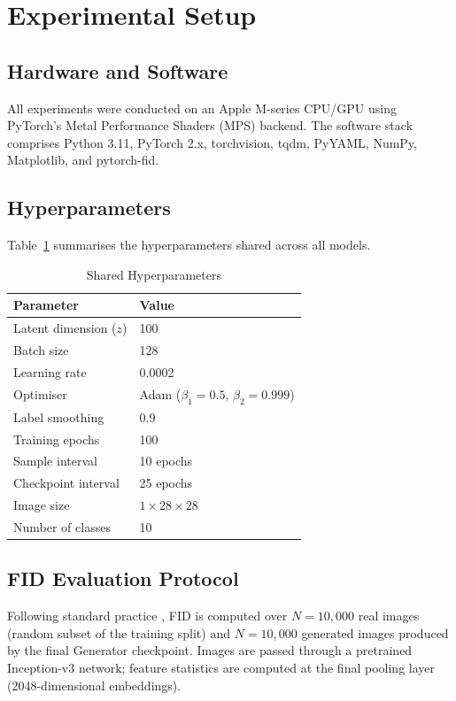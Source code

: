 \documentclass[conference]{IEEEtran}
\begin{document}
\section{Experimental Setup}
\label{sec:exp}

\subsection{Hardware and Software}
All experiments were conducted on an Apple M-series CPU/GPU using PyTorch's Metal Performance Shaders (MPS) backend. The software stack comprises Python 3.11, PyTorch 2.x, torchvision, tqdm, PyYAML, NumPy, Matplotlib, and pytorch-fid.

\subsection{Hyperparameters}
Table~\ref{tab:hyperparams} summarises the hyperparameters shared across all models.

\begin{table}[H]
\centering
\caption{Shared Hyperparameters}
\label{tab:hyperparams}
\begin{tabular}{ll}
\toprule
\textbf{Parameter} & \textbf{Value} \\
\midrule
Latent dimension ($z$) & 100 \\
Batch size & 128 \\
Learning rate & 0.0002 \\
Optimiser & Adam ($\beta_1=0.5$, $\beta_2=0.999$) \\
Label smoothing & 0.9 \\
Training epochs & 100 \\
Sample interval & 10 epochs \\
Checkpoint interval & 25 epochs \\
Image size & $1 \times 28 \times 28$ \\
Number of classes & 10 \\
\bottomrule
\end{tabular}
\end{table}

\subsection{FID Evaluation Protocol}
Following standard practice \cite{heusel2017fid}, FID is computed over $N=10{,}000$ real images (random subset of the training split) and $N=10{,}000$ generated images produced by the final Generator checkpoint. Images are passed through a pretrained Inception-v3 network; feature statistics are computed at the final pooling layer (2048-dimensional embeddings).
\end{document}
